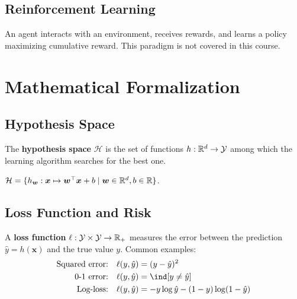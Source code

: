 \subsection{Reinforcement Learning}

An agent interacts with an environment, receives rewards, and learns a
policy maximizing cumulative reward. This paradigm is not covered in this
course.

\section{Mathematical Formalization}
\label{sec:formalization}

\subsection{Hypothesis Space}

\begin{definition}
The \textbf{hypothesis space} $\mathcal{H}$ is the
set of functions $h : \mathbb{R}^d \to \mathcal{Y}$ among which the learning
algorithm searches for the best one.
\end{definition}

\begin{example}
$\mathcal{H} = \{h_{\bm{w}} : \bm{x} \mapsto \bm{w}^\top \bm{x} + b
\mid \bm{w} \in \mathbb{R}^d, b \in \mathbb{R}\}$.
\end{example}

\subsection{Loss Function and Risk}

\begin{definition}
A \textbf{loss function} $\ell : \mathcal{Y} \times \mathcal{Y} \to \mathbb{R}_+$
measures the error between the prediction $\hat{y} = h(\bm{x})$ and the
true value $y$. Common examples:
\begin{align}
  \text{Squared error:} \quad & \ell(y, \hat{y}) = (y - \hat{y})^2 \\
  \text{0-1 error:} \quad & \ell(y, \hat{y}) = \ind[y \neq \hat{y}] \\
  \text{Log-loss:} \quad & \ell(y, \hat{y}) = -y\log\hat{y} - (1-y)\log(1-\hat{y})
\end{align}
\end{definition}


